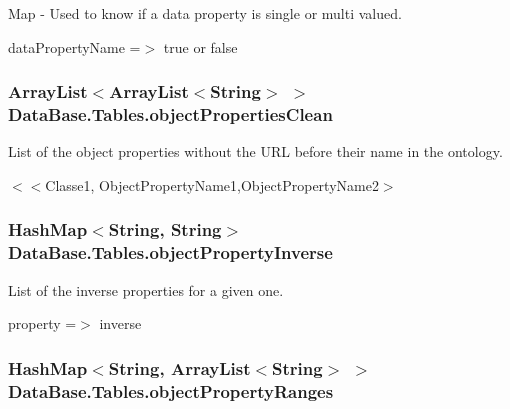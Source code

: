 Map -\/ Used to know if a data property is single or multi valued. 

dataPropertyName =$>$ true or false \hypertarget{class_data_base_1_1_tables_aefcb4c8a578671a32a64c3196281f479}{
\subsubsection[{objectPropertiesClean}]{\setlength{\rightskip}{0pt plus 5cm}ArrayList$<$ArrayList$<$String$>$ $>$ {\bf DataBase.Tables.objectPropertiesClean}}}
\label{class_data_base_1_1_tables_aefcb4c8a578671a32a64c3196281f479}


List of the object properties without the URL before their name in the ontology. 

$<$$<$Classe1, ObjectPropertyName1,ObjectPropertyName2$>$ \hypertarget{class_data_base_1_1_tables_a0465d81797980577fb423e6140df7110}{
\subsubsection[{objectPropertyInverse}]{\setlength{\rightskip}{0pt plus 5cm}HashMap$<$String, String$>$ {\bf DataBase.Tables.objectPropertyInverse}}}
\label{class_data_base_1_1_tables_a0465d81797980577fb423e6140df7110}


List of the inverse properties for a given one. 

property =$>$ inverse \hypertarget{class_data_base_1_1_tables_af580afd6f42aac3503cecab2e615ef73}{
\subsubsection[{objectPropertyRanges}]{\setlength{\rightskip}{0pt plus 5cm}HashMap$<$String, ArrayList$<$String$>$ $>$ {\bf DataBase.Tables.objectPropertyRanges}}}
\label{class_data_base_1_1_tables_af580afd6f42aac3503cecab2e615ef73}


